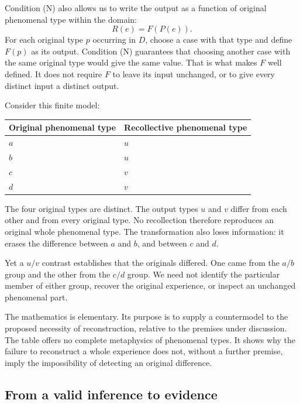 Condition (N) also allows us to write the output as a function of original phenomenal type within the domain:
\[
R(e)=F(P(e)).
\]
For each original type \(p\) occurring in \(D\), choose a case with that type and define \(F(p)\) as its output. Condition (N) guarantees that choosing another case with the same original type would give the same value. That is what makes \(F\) well defined. It does not require \(F\) to leave its input unchanged, or to give every distinct input a distinct output.


Consider this finite model:

\begin{center}\renewcommand{\arraystretch}{1.18}\begin{tabular}{@{}ll@{}}\toprule
Original phenomenal type & Recollective phenomenal type \\
\midrule
\(a\) & \(u\) \\
\(b\) & \(u\) \\
\(c\) & \(v\) \\
\(d\) & \(v\) \\
\bottomrule\end{tabular}\end{center}

The four original types are distinct. The output types \(u\) and \(v\) differ from each other and from every original type. No recollection therefore reproduces an original whole phenomenal type. The transformation also loses information: it erases the difference between \(a\) and \(b\), and between \(c\) and \(d\).

Yet a \(u/v\) contrast establishes that the originals differed. One came from the \(a/b\) group and the other from the \(c/d\) group. We need not identify the particular member of either group, recover the original experience, or inspect an unchanged phenomenal part.

The mathematics is elementary. Its purpose is to supply a countermodel to the proposed necessity of reconstruction, relative to the premises under discussion. The table offers no complete metaphysics of phenomenal types. It shows why the failure to reconstruct a whole experience does not, without a further premise, imply the impossibility of detecting an original difference.

\subsection*{From a valid inference to evidence}

